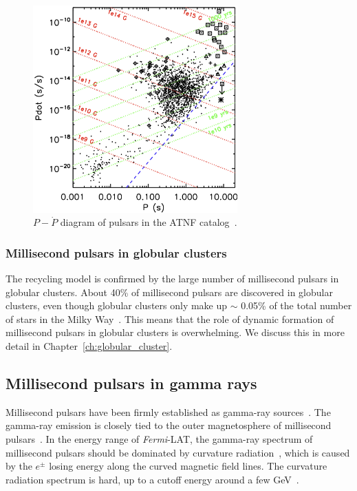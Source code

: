 \documentclass[doublespace,nopageskip]{VTthesis} %
\begin{document}
\begin{figure}[htb]
    \centering
    \includegraphics[width=0.7\textwidth]{Figures/Intro/PP.png}
    \caption{$P-\dot{P}$ diagram of pulsars in the ATNF catalog~\cite{2011AIPC.1357..269T,2005AJ....129.1993M}. }
    \label{fig:pp}
\end{figure}

\subsubsection{Millisecond pulsars in globular clusters}

The recycling model is confirmed by the large number of millisecond pulsars in globular clusters. About 40\% of millisecond pulsars are discovered in globular clusters, even though globular clusters only make up $\sim$ 0.05\% of the total number of stars in the Milky Way~\cite{2019ApJ...877..122Y}. This means that the role of dynamic formation of millisecond pulsars in globular clusters is overwhelming. We discuss this in more detail in Chapter~\ref{ch:globular_cluster}.

\subsection{Millisecond pulsars in gamma rays}

Millisecond pulsars have been firmly established as gamma-ray sources~\citep{1996A&A...311L...9V,2009ApJ...699.1171A,2013MNRAS.430..571E,2013ApJS..208...17A}. The gamma-ray emission is closely tied to the outer magnetosphere of millisecond pulsars~\cite{2021arXiv210105751H}. In the energy range of \textit{Fermi}-LAT, the gamma-ray spectrum of millisecond pulsars should be dominated by curvature radiation~\cite{2013ApJS..208...17A}, which is caused by the $e^\pm$ losing energy along the curved magnetic field lines. The curvature radiation spectrum is hard, up to a
cutoff energy around a few GeV~\cite{2005ApJ...622..531H}.
\end{document}

